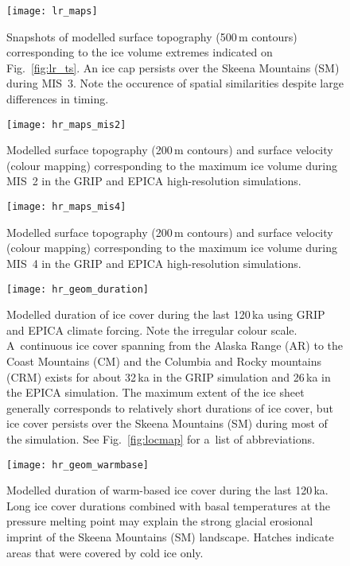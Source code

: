 \documentclass[tc, manuscript]{copernicus}
\begin{document}
\begin{figure}%
\texttt{[image: lr\_maps]}
\caption{%
      Snapshots of modelled surface topography (500\,\unit{m} contours)
      corresponding to the ice volume extremes indicated on
      Fig.~\ref{fig:lr_ts}. An ice cap persists over the Skeena Mountains
      (SM) during MIS~3. Note the occurence of spatial similarities despite
      large differences in timing.}
\label{fig:lr_maps}%
\end{figure}%


\begin{figure}%
\texttt{[image: hr\_maps\_mis2]}
\caption{%
      Modelled surface topography (200\,\unit{m} contours) and surface
      velocity (colour mapping) corresponding to the maximum ice volume
      during MIS~2 in the GRIP and EPICA high-resolution simulations.}
\label{fig:hr_maps_mis2}%
\end{figure}%


\begin{figure}%
\texttt{[image: hr\_maps\_mis4]}
\caption{%
      Modelled surface topography (200\,\unit{m} contours) and surface
      velocity (colour mapping) corresponding to the maximum ice volume
      during MIS~4 in the GRIP and EPICA high-resolution simulations.}
\label{fig:hr_maps_mis4}%
\end{figure}%


\begin{figure}%
\texttt{[image: hr\_geom\_duration]}
\caption{%
      Modelled duration of ice cover during the last 120\,\unit{ka} using
      GRIP and EPICA climate forcing. Note the irregular colour scale.
      A~continuous ice cover spanning from the Alaska Range (AR) to the
      Coast Mountains (CM) and the Columbia and Rocky mountains (CRM) exists
      for about 32\,\unit{ka} in the GRIP simulation and 26\,\unit{ka} in
      the EPICA simulation. The maximum extent of the ice sheet generally
      corresponds to relatively short durations of ice cover, but ice cover
      persists over the Skeena Mountains (SM) during most of the simulation.
      See Fig.~\ref{fig:locmap} for a~list of abbreviations.}
\label{fig:hr_geom_duration}%
\end{figure}%


\begin{figure}%
\texttt{[image: hr\_geom\_warmbase]}
\caption{%
      Modelled duration of warm-based ice cover during the last
      120\,\unit{ka}. Long ice cover durations combined with basal
      temperatures at the pressure melting point may explain the strong
      glacial erosional imprint of the Skeena Mountains (SM) landscape.
      Hatches indicate areas that were covered by cold ice only.}
\label{fig:hr_geom_warmbase}%
\end{figure}%
\end{document}
